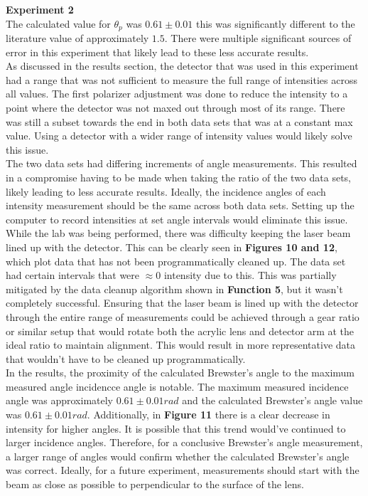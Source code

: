 \documentclass[
	letterpaper, %
	10pt, %
]{CSUniSchoolLabReport}
\begin{document}
\textbf{Experiment 2}\\
The calculated value for $\theta_p$ was $0.61\pm 0.01$ this was significantly different to the literature value of
approximately $1.5$. There were multiple significant sources of error in this experiment that likely lead to
these less accurate results. \\

As discussed in the results section, the detector that was used in this experiment had a range that was not sufficient to measure
the full range of intensities across all values. The first polarizer adjustment was done to reduce the
intensity to a point where the detector was not maxed out through most of its range. There was still a subset
towards the end in both data sets that was at a constant max value. Using a detector with a wider
range of intensity values would likely solve this issue.\\

The two data sets had differing increments of angle measurements. This resulted in a compromise having to be
made when taking the ratio of the two data sets, likely leading to less accurate results. Ideally, the
incidence angles of each intensity measurement should be the same across both data sets. Setting up the
computer to record intensities at set angle intervals would eliminate this issue.\\

While the lab was being performed, there was difficulty keeping the laser beam lined up with the detector.
This can be clearly seen in \textbf{Figures 10 and 12}, which plot data that has not been programmatically cleaned up.
The data set had certain intervals that were $\approx 0$ intensity due to this. This was partially
mitigated by the data cleanup algorithm shown in \textbf{Function 5}, but it wasn't completely successful.
Ensuring that the laser beam is lined up with the detector through the entire range of measurements
could be achieved through a gear ratio or similar setup that would rotate both the acrylic lens and detector
arm at the ideal ratio to maintain alignment. This would result in more representative data that
wouldn't have to be cleaned up programmatically.\\

In the results, the proximity of the calculated Brewster's angle to the maximum measured angle
incidencce angle is notable. The maximum measured incidence angle was approximately $0.61\pm0.01rad$
and the calculated Brewster's angle value was $0.61\pm0.01rad$. Additionally, in \textbf{Figure 11} there is a
clear decrease in intensity for higher angles. It is possible that this trend would've continued to larger
incidence angles. Therefore, for a conclusive Brewster's angle measurement, a larger range of angles would
confirm whether the calculated Brewster's angle was correct. Ideally, for a future experiment, measurements
should start with the beam as close as possible to perpendicular to the surface of the lens.\\
\end{document}
